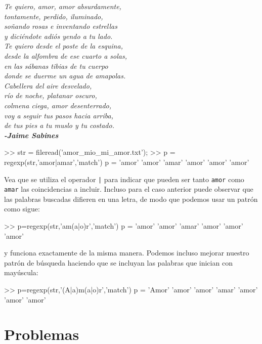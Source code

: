 \emph{Te quiero, amor, amor absurdamente,}\\
\emph{tontamente, perdido, iluminado,}\\
\emph{soñando rosas e inventando estrellas}\\
\emph{y diciéndote adiós yendo a tu lado.} \\

\emph{Te quiero desde el poste de la esquina,}\\
\emph{desde la alfombra de ese cuarto a solas,}\\
\emph{en las sábanas tibias de tu cuerpo}\\
\emph{donde se duerme un agua de amapolas.} \\

\emph{Cabellera del aire desvelado,}\\
\emph{río de noche, platanar oscuro,}\\
\emph{colmena ciega, amor desenterrado,}\\
\emph{voy a seguir tus pasos hacia arriba,}\\
\emph{de tus pies a tu muslo y tu costado.}\\

{\bf\it -Jaime Sabines}

\begin{matlab}
>> str = fileread('amor_mio_mi_amor.txt');
>> p = regexp(str,'amor|amar','match')
p = 
    'amor'    'amor'    'amar'    'amor'    'amor'    'amor'
\end{matlab}

Vea que se utiliza el operador \texttt{|} para indicar que
pueden ser tanto \texttt{amor} como \texttt{amar} las coincidencias a
incluir. Incluso para el caso anterior puede observar que las palabras
buscadas difieren en una letra, de modo que podemos usar un patrón como
sigue:

\begin{matlab}
>> p=regexp(str,'am(a|o)r','match')
p = 
    'amor'    'amor'    'amar'    'amor'    'amor'    'amor'
\end{matlab}

y funciona exactamente de la misma manera. Podemos incluso mejorar
nuestro patrón de búsqueda haciendo que se incluyan las palabras que
inician con mayúscula:

\begin{matlab}
>> p=regexp(str,'(A|a)m(a|o)r','match')
p = 
    'Amor'    'amor'    'amor'    'amar'    'amor'    'amor'    'amor'
\end{matlab}


\section*{Problemas}
